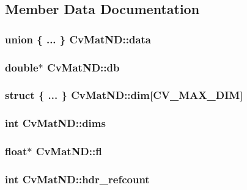 \subsection{Member Data Documentation}
\hypertarget{structCvMatND_aa1110d922b276d42b59e68d6dae25fd6}{
\subsubsection[{data}]{\setlength{\rightskip}{0pt plus 5cm}union \{ ... \}   Cv\-Mat\-N\-D\-::data}}\label{structCvMatND_aa1110d922b276d42b59e68d6dae25fd6}
\hypertarget{structCvMatND_a448a65a38d34e2a2781dd631ec97d416}{
\subsubsection[{db}]{\setlength{\rightskip}{0pt plus 5cm}double$\ast$ Cv\-Mat\-N\-D\-::db}}\label{structCvMatND_a448a65a38d34e2a2781dd631ec97d416}
\hypertarget{structCvMatND_a932f641733ae7f515415b06b6b36a7e8}{
\subsubsection[{dim}]{\setlength{\rightskip}{0pt plus 5cm}struct \{ ... \} 
     Cv\-Mat\-N\-D\-::dim\mbox{[}{\bf C\-V\-\_\-\-M\-A\-X\-\_\-\-D\-I\-M}\mbox{]}}}\label{structCvMatND_a932f641733ae7f515415b06b6b36a7e8}
\hypertarget{structCvMatND_afb407ea1679e188af57c7c1301de70d2}{
\subsubsection[{dims}]{\setlength{\rightskip}{0pt plus 5cm}int Cv\-Mat\-N\-D\-::dims}}\label{structCvMatND_afb407ea1679e188af57c7c1301de70d2}
\hypertarget{structCvMatND_a7402a379321e1bcfe94a476ed33afefd}{
\subsubsection[{fl}]{\setlength{\rightskip}{0pt plus 5cm}float$\ast$ Cv\-Mat\-N\-D\-::fl}}\label{structCvMatND_a7402a379321e1bcfe94a476ed33afefd}
\hypertarget{structCvMatND_a72e2864dc5e48f873cd6e34b99491ceb}{
\subsubsection[{hdr\-\_\-refcount}]{\setlength{\rightskip}{0pt plus 5cm}int Cv\-Mat\-N\-D\-::hdr\-\_\-refcount}}\label{structCvMatND_a72e2864dc5e48f873cd6e34b99491ceb}
